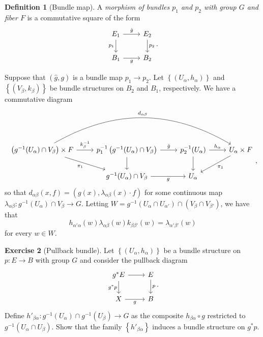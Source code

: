 \documentclass[10pt,letterpaper,cm]{nupset}
\theoremstyle{definition}
\newtheorem{defn}{Definition}[subsection]
\theoremstyle{theorem}
\newtheorem{exercise}[defn]{Exercise}
\theoremstyle{remark}
\newcommand{\1}{\mathbb{1}}
\newcommand{\0}{\vec 0}
\begin{document}
\begin{defn}[Bundle map]
A \textit{morphism of bundles $p_1$ and $p_2$ with group $G$ and fiber $F$} is a commutative square of the form
\[
\begin{tikzcd}
E_1 \arrow[r, "\hat{g}"] \arrow[d, "p_1"'] & E_2 \arrow[d, "p_2"] \\
B_1 \arrow[r, "g"']                        & B_2                 
\end{tikzcd}
.\]
\end{defn}

Suppose that $\left(\hat{g}, g\right)$ is a bundle map $p_1 \to p_2$.  Let $\left\{\left(U_{\alpha}, h_{\alpha}\right)\right\}$ and $\left\{\left(V_{\beta}, k_{\beta}\right)\right\}$ be bundle structures on $B_2$ and $B_1$, respectively.  We have a commutative diagram
\[
\begin{tikzcd}
\left(g^{-1}(U_{\alpha}) \cap V_{\beta}\right) \times F \arrow[rd, "\pi_1"'] \arrow[rrr, "d_{\alpha{\beta}}", bend left] \arrow[r, "k_{\beta}^{-1}"] & p^{-1}_1\left(g^{-1}(U_{\alpha}) \cap V_{\beta}\right) \arrow[d] \arrow[r, "\hat{g}"] & p^{-1}_2(U_{\alpha}) \arrow[d] \arrow[r, "h_{\alpha}"] & U_{\alpha}\times F \arrow[ld, "\pi_1"] \\
                                                                                                                                                         & g^{-1}(U_{\alpha})\cap V_{\beta} \arrow[r, "g"']                                        & U_{\alpha}                                               &                                       
\end{tikzcd}
,\] so that $d_{\alpha{\beta}}(x,f)  = \left(g(x), \lambda_{\alpha{\beta}}(x) \cdot f\right)$ for some continuous map $\lambda_{\alpha{\beta}} : g^{-1}(U_{\alpha})\cap V_{\beta} \to G$. Letting $W = g^{-1}(U_{\alpha} \cap U_{\alpha'}) \cap (V_{\beta} \cap V_{\beta'})$, we have that 
\[
h_{\alpha'{\alpha}}(w)\lambda_{\alpha{\beta}}(w)k_{\beta{\beta'}}(w) = \lambda_{\alpha'{\beta'}}(w) \label{eq:mapcycle} \tag{$\dagger$}
\] for every $w\in W$.

\begin{exercise}[Pullback bundle]
Let  $\left\{\left(U_{\alpha}, h_{\alpha}\right)\right\}$ be a bundle structure on $p: E \to B$ with group $G$ and consider the pullback diagram \[
\begin{tikzcd}
g^{\ast}{E} \arrow[d, "g^{\ast}{p}"'] \arrow[r] & E \arrow[d, "p"] \\
X \arrow[r, "g"']                               & B               
\end{tikzcd}
.\] Define $h'_{\beta{\alpha}}: g^{-1}(U_{\alpha}) \cap g^{-1}(U_{\beta}) \to G$ as the composite $h_{\beta{\alpha}} \circ g$ restricted to  $g^{-1}(U_{\alpha} \cap U_{\beta})$. Show that the family $\left\{h'_{\beta{\alpha}}\right\}$ induces a bundle structure on $g^{\ast}{p}$.
\end{exercise}
\end{document}
